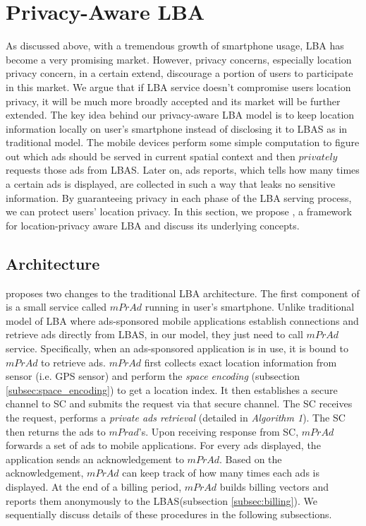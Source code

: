 
\section{Privacy-Aware LBA}
As discussed above, with a tremendous growth of smartphone usage, LBA has become a very promising market. However, privacy concerns, especially location privacy concern, in a certain extend, discourage a portion of users to participate in this market. We argue that if LBA service doesn't compromise users location privacy, it will be much more broadly accepted and its market will be further extended. The key idea behind our privacy-aware LBA model is to keep location information locally on user's smartphone instead of disclosing it to LBAS as in traditional model. The mobile devices perform some simple computation to figure out which ads should be served in current spatial context and then $privately$ requests those ads from LBAS. Later on, ads reports, which tells how many times a certain ads is displayed, are collected in such a way that leaks no sensitive information. By guaranteeing privacy in each phase of the LBA serving process, we can protect users' location privacy. In this section, we propose \codename, a framework for location-privacy aware LBA and discuss its underlying concepts. 

\subsection{Architecture}
\codename proposes two changes to the traditional LBA architecture. The first component of \codename is a small service called $mPrAd$ running in user's smartphone. Unlike traditional model of LBA where ads-sponsored mobile applications establish connections and retrieve ads directly from LBAS, in our model, they just need to call $mPrAd$ service.
Specifically, when an ads-sponsored application is in use, it is bound to $mPrAd$ to retrieve ads. $mPrAd$ first collects exact location information from sensor (i.e. GPS sensor) and perform the \textit{space encoding} (subsection \ref{subsec:space_encoding}) to get a location index. It then establishes a secure channel to SC and submits the request via that secure channel. The SC receives the request, performs a \textit{private ads retrieval} (detailed in \textit{Algorithm 1}). The SC then returns the ads to $mPrad$'s. Upon receiving response from SC, $mPrAd$ forwards a set of ads to mobile applications. For every ads displayed, the application sends an acknowledgement to $mPrAd$. Based on the acknowledgement, $mPrAd$ can keep track of how many times each ads is displayed. At the end of a billing period, $mPrAd$ builds billing vectors and reports them anonymously to the LBAS(subsection \ref{subsec:billing}). We sequentially discuss details of these procedures in the following subsections. 

